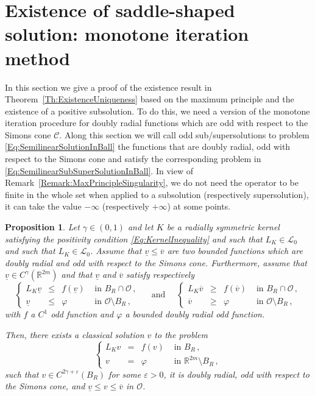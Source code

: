 \documentclass[12pt,reqno]{amsart}
\newtheorem{proposition}[theorem]{Proposition}
\theoremstyle{definition}
\theoremstyle{remark}
\newcommand{\con}[1]{\mathbb{#1}}
\newcommand{\R}{\con{R}} %
\newcommand{\ccal}{\mathscr{C}}
\newcommand{\lcal}{\mathcal{L}}
\newcommand{\ocal}{\mathcal{O}}
\newcommand{\s}{\gamma}
\newcommand\beqc[1]{\left\{\begin{array}{#1}}
\newcommand\eeqc{\end{array} \right.}
\def\PDEsystem{rcll}
\newcommand{\vsub}{\underline{v}}
\newcommand{\vsup}{\overline{v}}
\numberwithin{equation}{section}
\begin{document}


\section{Existence of saddle-shaped solution: monotone iteration method}
\label{Sec:Existence}


In this section we give a proof of the existence result in Theorem~\ref{Th:ExistenceUniqueness} based on the maximum principle and the existence of a positive subsolution. To do this, we need a version of the monotone iteration procedure for doubly radial functions which are odd with respect to the Simons cone $\ccal$. Along this section we will call odd sub/supersolutions to problem \eqref{Eq:SemilinearSolutionInBall} the functions that are doubly radial, odd with respect to the Simons cone and satisfy the corresponding problem in \eqref{Eq:SemilinearSubSuperSolutionInBall}. In view of Remark~\ref{Remark:MaxPrincipleSingularity}, we do not need the operator to be finite in the whole set when applied to a subsolution (respectively supersolution), it can take the value $-\infty$ (respectively $+\infty$) at some points.

\begin{proposition}
	\label{Prop:MonotoneIterationOdd}
	Let $\s\in (0,1)$ and let $K$ be a radially symmetric kernel  satisfying the positivity condition \eqref{Eq:KernelInequality} and such that $L_K\in \lcal_0$ and such that $L_K\in \lcal_0$. Assume that $\vsub \leq \vsup$ are two bounded functions which are doubly radial and odd with respect to the Simons cone. Furthermore, assume that $\vsub\in C^\s(\R^{2m})$ and that $\vsub$ and $\vsup$ satisfy respectively   
	\begin{equation}
	\label{Eq:SemilinearSubSuperSolutionInBall}
	\beqc{\PDEsystem}
	L_K\vsub & \leq & f(\vsub) & \textrm{ in } B_R \cap \ocal\,, \\
	\vsub & \leq & \varphi & \textrm{ in } \ocal \setminus B_R\,, 
	\eeqc
	\quad \textrm{ and } \quad 
	\beqc{\PDEsystem}
	L_K\vsup & \geq & f(\vsup) & \textrm{ in } B_R \cap \ocal\,, \\
	\vsup & \geq & \varphi & \textrm{ in } \ocal \setminus B_R\,, 
	\eeqc
	\end{equation}
	with $f$ a $C^1$ odd function and $\varphi$ a bounded doubly radial odd function.
	
	Then, there exists a classical solution $v$ to the problem
	\begin{equation}
	\label{Eq:SemilinearSolutionInBall}
	\beqc{\PDEsystem}
	L_K v & = & f(v) & \textrm{ in } B_R\,, \\
	v &=& \varphi &  \textrm{ in } \R^{2m} \setminus B_R\,, 
	\eeqc
	\end{equation}
	such that $v\in C^{2\s+\varepsilon}(B_R)$ for some $\varepsilon>0$, it is doubly radial, odd with respect to the Simons cone, and  $\vsub \leq v \leq \vsup$ in $\ocal$.
\end{proposition}
\end{document}
